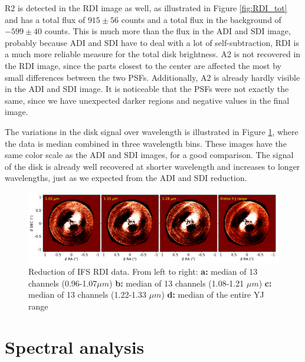 \documentclass[twoside,single]{lion-msc}
\begin{document}
R2 is detected in the RDI image as well, as illustrated in Figure \ref{fig:RDI_tot} and has a total flux of $915 \pm 56$ counts and a total flux in the background of $-599 \pm 40$ counts. This is much more than the flux in the ADI and SDI image, probably because ADI and SDI have to deal with a lot of self-subtraction, RDI is a much more reliable measure for the total disk brightness. A2 is not recovered in the RDI image, since the parts closest to the center are affected the most by small differences between the two PSFs. Additionally, A2 is  already hardly visible in the ADI and SDI image. It is noticeable that the PSFs were not exactly the same, since we have unexpected darker regions and negative values in the final image.
\bigskip

The variations in the disk signal over wavelength is illustrated in Figure \ref{fig:RDIcolor}, where the data is median combined in three wavelength bins. These images have the same color scale as the ADI and SDI images, for a good comparison. The signal of the disk is already well recovered at shorter wavelength and increases to longer wavelengths, just as we expected from the ADI and SDI reduction.

\begin{figure}[htb]
\centering
\includegraphics[trim={0cm 0cm 0cm 0cm},clip,width = \textwidth]{RDI_color_imcon}
\caption{Reduction of IFS RDI data. From left to right: \textbf{a:} median of 13 channels (0.96-1.07$\mu m$) \textbf{b:} median of 13 channels (1.08-1.21 $\mu m$) \textbf{c:} median of 13 channels (1.22-1.33 $\mu m$) \textbf{d:} median of the entire YJ range}
\label{fig:RDIcolor}
\end{figure}

\chapter{Spectral analysis}
\end{document}
